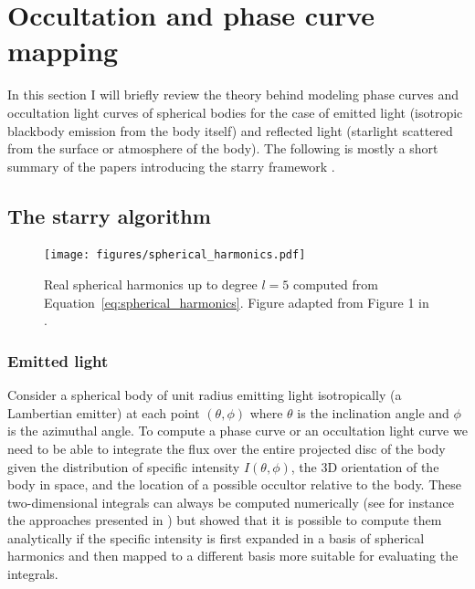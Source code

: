 \documentclass[12pt,dvipsnames]{report}
\begin{document}
\section{Occultation and phase curve mapping}
\label{sec:occultations}
In this section I will briefly review the theory behind modeling phase curves and
occultation light curves of spherical bodies for the case of emitted light
(isotropic blackbody emission from the body itself) and reflected light
(starlight scattered from the surface or atmosphere of the body). The following is
mostly a short summary of the papers introducing the \textsf{starry} framework
\citep{2019AJ....157...64L,2021arXiv210306275L}.
\subsection{The starry algorithm}
\begin{figure}[t]
    \begin{centering}
        \texttt{[image: figures/spherical\_harmonics.pdf]}
        \caption{Real spherical harmonics up to degree $l=5$ computed from
            Equation~\ref{eq:spherical_harmonics}. Figure adapted from Figure 1 in
            \citet{2019AJ....157...64L}.}
        \label{fig:spherical_harmonics}
    \end{centering}
\end{figure}
\subsubsection{Emitted light}
Consider a spherical body of unit radius emitting light isotropically (a
Lambertian emitter) at each point $(\theta,\phi)$ where $\theta$ is the
inclination angle and $\phi$ is the azimuthal angle. To compute a phase curve
or an occultation light curve we need to be able to integrate the flux over the
entire projected disc of the body given the distribution of specific intensity
$I(\theta, \phi)$, the 3D orientation of the body in space, and the location of
a possible occultor relative to the body. These two-dimensional integrals can
always be computed numerically (see for instance the approaches presented in
\citet{2018AJ....156..146F,2018MNRAS.477.2613L}) but
\citet{2019AJ....157...64L} showed that it is possible to compute them
analytically if the specific intensity is first expanded in a basis of
spherical harmonics and then mapped to a different basis more suitable for
evaluating the integrals.
\end{document}
